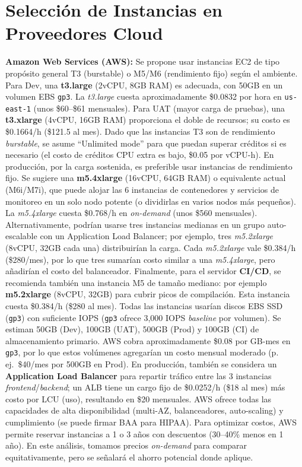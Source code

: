 \documentclass[12pt]{article}
\begin{document}
\section{Selección de Instancias en Proveedores Cloud}
\textbf{Amazon Web Services (AWS):} Se propone usar instancias EC2 de tipo propósito general T3 (burstable) o M5/M6 (rendimiento fijo) según el ambiente. Para Dev, una \textbf{t3.large} (2vCPU, 8GB RAM) es adecuada, con 50GB en un volumen EBS \texttt{gp3}. La \emph{t3.large} cuesta aproximadamente \$0.0832 por hora en \texttt{us-east-1} (unos \$60--\$61 mensuales). Para UAT (mayor carga de pruebas), una \textbf{t3.xlarge} (4vCPU, 16GB RAM) proporciona el doble de recursos; su costo es \$0.1664/h (\$121.5 al mes). Dado que las instancias T3 son de rendimiento \emph{burstable}, se asume \enquote{Unlimited mode} para que puedan superar créditos si es necesario (el costo de créditos CPU extra es bajo, \$0.05 por vCPU-h). En producción, por la carga sostenida, es preferible usar instancias de rendimiento fijo. Se sugiere una \textbf{m5.4xlarge} (16vCPU, 64GB RAM) o equivalente actual (M6i/M7i), que puede alojar las 6 instancias de contenedores y servicios de monitoreo en un solo nodo potente (o dividirlas en varios nodos más pequeños). La \emph{m5.4xlarge} cuesta \$0.768/h en \emph{on-demand} (unos \$560 mensuales). Alternativamente, podrían usarse tres instancias medianas en un grupo auto-escalable con un Application Load Balancer; por ejemplo, tres \emph{m5.2xlarge} (8vCPU, 32GB cada una) distribuirían la carga. Cada \emph{m5.2xlarge} vale \$0.384/h (\$280/mes), por lo que tres sumarían costo similar a una \emph{m5.4xlarge}, pero añadirían el costo del balanceador. Finalmente, para el servidor \textbf{CI/CD}, se recomienda también una instancia M5 de tamaño mediano: por ejemplo \textbf{m5.2xlarge} (8vCPU, 32GB) para cubrir picos de compilación. Esta instancia cuesta \$0.384/h (\$280 al mes). Todas las instancias usarían discos EBS SSD (\texttt{gp3}) con suficiente IOPS (\texttt{gp3} ofrece 3{,}000 IOPS \emph{baseline} por volumen). Se estiman 50GB (Dev), 100GB (UAT), 500GB (Prod) y 100GB (CI) de almacenamiento primario. AWS cobra aproximadamente \$0.08 por GB-mes en \texttt{gp3}, por lo que estos volúmenes agregarían un costo mensual moderado (p.\,ej.\ \$40/mes por 500GB en Prod). En producción, también se considera un \textbf{Application Load Balancer} para repartir tráfico entre las 3 instancias \emph{frontend}/\emph{backend}; un ALB tiene un cargo fijo de \$0.0252/h (\$18 al mes) más costo por LCU (uso), resultando en \$20 mensuales. AWS ofrece todas las capacidades de alta disponibilidad (multi-AZ, balanceadores, auto-scaling) y cumplimiento (se puede firmar BAA para HIPAA). Para optimizar costos, AWS permite reservar instancias a 1 o 3 años con descuentos (30--40\% menos en 1 año). En este análisis, tomamos precios \emph{on-demand} para comparar equitativamente, pero se señalará el ahorro potencial donde aplique.
\end{document}
